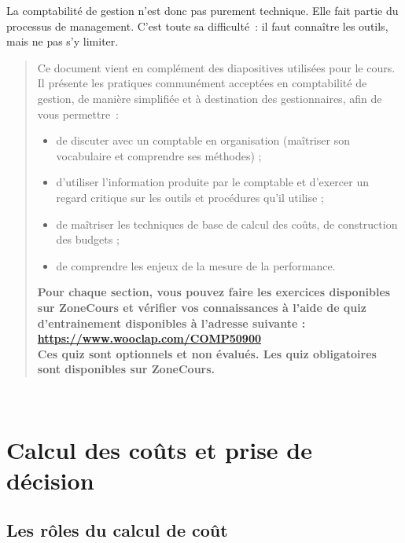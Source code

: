 \documentclass{kaobook}
\begin{document}
La comptabilité de gestion n'est donc pas purement technique. Elle fait partie du processus de management. C'est toute sa difficulté : il faut connaître les outils, mais ne pas s'y limiter.\\


\begin{quote}
Ce document vient en complément des diapositives utilisées pour le cours. Il présente les pratiques communément acceptées en comptabilité de gestion, de manière simplifiée et à destination des gestionnaires, afin de vous permettre :\\
\begin{itemize}
\item de discuter avec un comptable en organisation (maîtriser son vocabulaire et comprendre ses méthodes) ;\\
\item d'utiliser l’information produite par le comptable et d'exercer un regard critique sur les outils et procédures qu’il utilise ;\\
\item de maîtriser les techniques de base de calcul des coûts, de construction des budgets ;\\
\item de comprendre les enjeux de la mesure de la performance.\\
\end{itemize}
\textbf{Pour chaque section, vous pouvez faire les exercices disponibles sur ZoneCours et vérifier vos connaissances à l'aide de quiz d’entrainement disponibles à l'adresse suivante : \url{https://www.wooclap.com/COMP50900} \\
Ces quiz sont optionnels et non évalués. Les quiz obligatoires sont disponibles sur ZoneCours.}\\
\end{quote}
\clearpage\\
\chapter{Calcul des coûts et prise de décision}
\label{sec:orgb3634df}
\section{Les rôles du calcul de coût}
\label{sec:org6b224a9}
\end{document}
